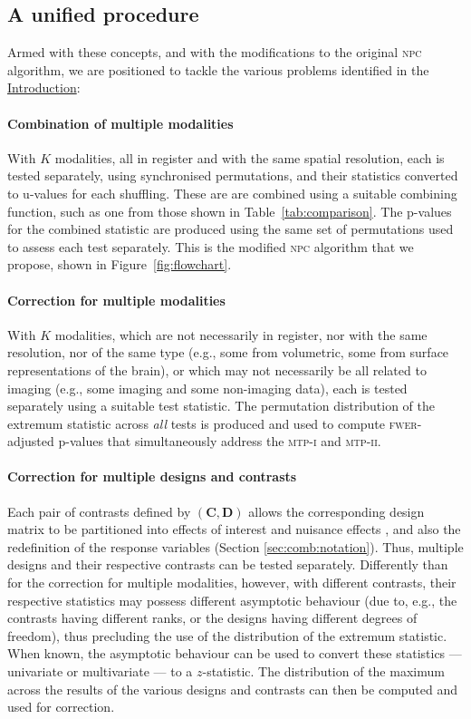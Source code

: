\subsection{A unified procedure}

Armed with these concepts, and with the modifications to the original \textsc{npc} algorithm, we are positioned to tackle the various problems identified in the \href{sec:comb:intro}{Introduction}:

\paragraph{Combination of multiple modalities} With $K$ modalities, all in register and with the same spatial resolution, each is tested separately, using synchronised permutations, and their statistics converted to u-values for each shuffling. These are are combined using a suitable combining function, such as one from those shown in Table~\ref{tab:comparison}. The p-values for the combined statistic are produced using the same set of permutations used to assess each test separately. This is the modified \textsc{npc} algorithm that we propose, shown in Figure~\ref{fig:flowchart}.

\paragraph{Correction for multiple modalities} With $K$ modalities, which are not necessarily in register, nor with the same resolution, nor of the same type (e.g., some from volumetric, some from surface representations of the brain), or which may not necessarily be all related to imaging (e.g., some imaging and some non-imaging data), each is tested separately using a suitable test statistic. The permutation distribution of the extremum statistic across \emph{all} tests is produced and used to compute \textsc{fwer}-adjusted p-values that simultaneously address the \textsc{mtp-i} and \textsc{mtp-ii}.

\paragraph{Correction for multiple designs and contrasts} Each pair of contrasts defined by $\left(\mathbf{C}, \mathbf{D}\right)$ allows the corresponding design matrix to be partitioned into effects of interest and nuisance effects \citep[][Appendix A]{Winkler2014}, and also the redefinition of the response variables (Section \ref{sec:comb:notation}). Thus, multiple designs and their respective contrasts can be tested separately. Differently than for the correction for multiple modalities, however, with different contrasts, their respective statistics may possess different asymptotic behaviour (due to, e.g., the contrasts having different ranks, or the designs having different degrees of freedom), thus precluding the use of the distribution of the extremum statistic. When known, the asymptotic behaviour can be used to convert these statistics --- univariate or multivariate --- to a $z$-statistic. The distribution of the maximum across the results of the various designs and contrasts can then be computed and used for correction.

